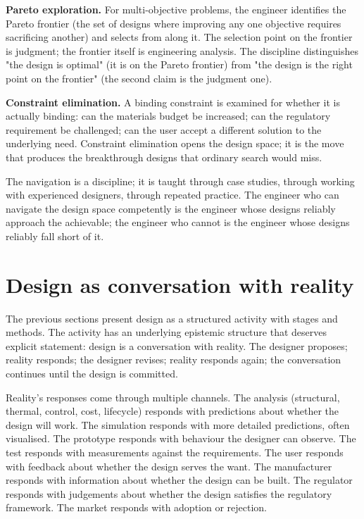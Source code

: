 \textbf{Pareto exploration.} For multi-objective problems, the engineer identifies the Pareto frontier (the set of designs where improving any one objective requires sacrificing another) and selects from along it. The selection point on the frontier is judgment; the frontier itself is engineering analysis. The discipline distinguishes "the design is optimal" (it is on the Pareto frontier) from "the design is the right point on the frontier" (the second claim is the judgment one).

\textbf{Constraint elimination.} A binding constraint is examined for whether it is actually binding: can the materials budget be increased; can the regulatory requirement be challenged; can the user accept a different solution to the underlying need. Constraint elimination opens the design space; it is the move that produces the breakthrough designs that ordinary search would miss.

The navigation is a discipline; it is taught through case studies, through working with experienced designers, through repeated practice. The engineer who can navigate the design space competently is the engineer whose designs reliably approach the achievable; the engineer who cannot is the engineer whose designs reliably fall short of it.

\section{Design as conversation with reality}

The previous sections present design as a structured activity with stages and methods. The activity has an underlying epistemic structure that deserves explicit statement: design is a conversation with reality. The designer proposes; reality responds; the designer revises; reality responds again; the conversation continues until the design is committed.

Reality's responses come through multiple channels. The analysis (structural, thermal, control, cost, lifecycle) responds with predictions about whether the design will work. The simulation responds with more detailed predictions, often visualised. The prototype responds with behaviour the designer can observe. The test responds with measurements against the requirements. The user responds with feedback about whether the design serves the want. The manufacturer responds with information about whether the design can be built. The regulator responds with judgements about whether the design satisfies the regulatory framework. The market responds with adoption or rejection.

